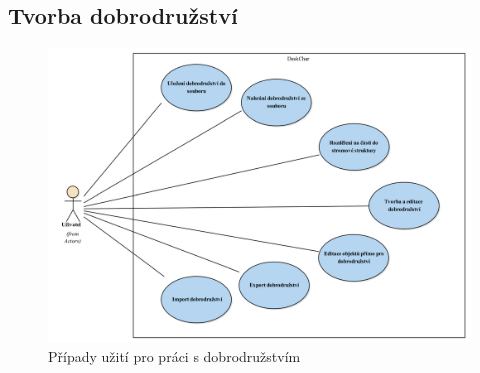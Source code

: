 \documentclass[thesis=B,czech]{resources/FITthesis}[2012/06/26]
\begin{document}
\subsection{Tvorba dobrodružství}
	\begin{figure}\centering
		\includegraphics[width=1\textwidth]{images/usecase-dobrodruzstvi.pdf}
		\caption[Případy užití pro dobrodružstvím]{Případy užití pro práci s dobrodružstvím}			\label{fig:uc_sablony}
	\end{figure}
	
\end{document}
